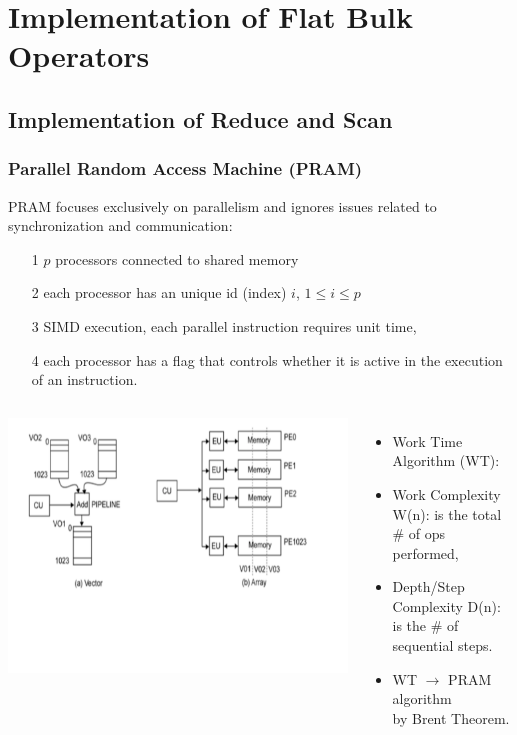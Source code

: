 \documentclass{beamer}
\renewcommand{\emph}[1]{\textcolor{structure}{#1}}
\newcommand{\emp}[1]{\textcolor{DikuRed}{ #1}}
\begin{document}
\section{Implementation of Flat Bulk Operators}

\begin{frame}[fragile]
	\tableofcontents[currentsection]
\end{frame}

\subsection{Implementation of Reduce and Scan}

\begin{frame}[fragile,t]
  \frametitle{Parallel Random Access Machine (PRAM)}

PRAM focuses exclusively on parallelism and ignores issues
related to synchronization and communication:
\begin{itemize}
    \item[1] $p$ processors connected to shared memory
    \item[2] each processor has an unique id (index) $i$, $1 \leq i \leq p$
    \item[3] SIMD execution, each parallel instruction requires unit time,
    \item[4] each processor has a flag that controls whether it is active
                in the execution of an instruction.
\end  {itemize}


\begin{columns}
\includegraphics[height=37ex]{Figures/L2/VectorMachine}
\vspace{-15ex}
\begin{itemize}
    \item \emp{Work Time Algorithm (WT):}
    \item \emp{Work Complexity W(n)}: is the total \# of ops performed,
    \item \emp{Depth/Step Complexity D(n)}: is the \# of sequential steps.\medskip
    \item \emph{WT $\longrightarrow$ PRAM algorithm\\by Brent Theorem}.
\end{itemize}
\end{columns}

\end{frame}
\end{document}
